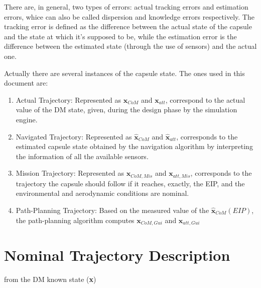 There are, in general, two types of errors: actual tracking errors and estimation
errors, whice can also be called dispersion and knowledge errors respectively.
The tracking error is defined as the difference between the actual state of the capsule and the state
at which it's supposed to be, while the estimation error is the difference between the estimated state
(through the use of sensors) and the actual one.

Actually there are several instances of the capsule state. The ones used in this document are:

\begin{enumerate}
    \item Actual Trajectory: Represented as $\textbf{x}_{CoM}$ and $\textbf{x}_{att}$, correspond
    to the actual value of the DM state, given, during the design phase by the simulation engine.
    \item Navigated Trajectory: Represented as $\hat{\textbf{x}}_{CoM}$ and $\hat{\textbf{x}}_{att}$,
    corresponds to the estimated capsule state obtained by the navigation algorithm by interpreting the
    information of all the available sensors.
    \item Mission Trajectory: Represented as $\textbf{x}_{CoM,Mis}$ and $\textbf{x}_{att,Mis}$, corresponds to the trajectory
    the capsule should follow if it reaches, exactly, the EIP, and the environmental and aerodynamic conditions are nominal.
    \item Path-Planning Trajectory: Based on the measured value of the $\hat{\textbf{x}}_{CoM}(EIP)$, the path-planning 
    algorithm computes $\textbf{x}_{CoM,Gui}$ and $\textbf{x}_{att,Gui}$  
\end{enumerate}

\newpage

\section{Nominal Trajectory Description}

from the DM known state (\textbf{x})